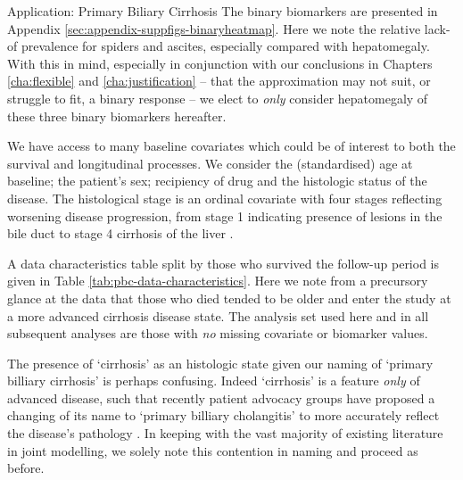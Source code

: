 \begin{chapter}{\label{cha:app-PBC}Application: Primary Biliary Cirrhosis}
  The binary biomarkers are presented in Appendix \ref{sec:appendix-suppfigs-binaryheatmap}. Here we note the relative lack-of prevalence for spiders and ascites, especially compared with hepatomegaly. With this in mind, especially in conjunction with our conclusions in Chapters \ref{cha:flexible} and \ref{cha:justification} -- that the approximation may not suit, or struggle to fit, a binary response -- we elect to \textit{only} consider hepatomegaly of these three binary biomarkers hereafter.

  We have access to many baseline covariates which could be of interest to both the survival and longitudinal processes. We consider the (standardised) age at baseline; the patient's sex; recipiency of drug and the histologic  status of the disease. The histological stage is an ordinal covariate with four stages reflecting worsening disease progression, from stage 1 indicating presence of lesions in the bile duct to stage 4 cirrhosis of the liver \citep{PBCpatho}.
  
  A data characteristics table split by those who survived the follow-up period is given in Table \ref{tab:pbc-data-characteristics}. Here we note from a precursory glance at the data that those who died tended to be older and enter the study at a more advanced cirrhosis disease state. The analysis set used here and in all subsequent analyses are those with \textit{no} missing covariate or biomarker values.

  \begin{remark}
      The presence of `cirrhosis' as an histologic state given our naming of `primary billiary cirrhosis' is perhaps confusing. Indeed `cirrhosis' is a feature \textit{only} of advanced disease, such that recently patient advocacy groups have proposed a changing of its name to `primary billiary cholangitis' to more accurately reflect the disease's pathology \citep{PBCnamechange}. In keeping with the vast majority of existing literature in joint modelling, we solely note this contention in naming and proceed as before.
  \end{remark}


\end{chapter}
